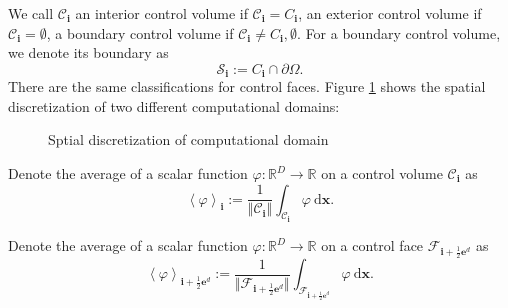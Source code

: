 We call $\mathcal{C}_{\mathbf{i}}$ an interior control volume if
$\mathcal{C}_{\mathbf{i}} = C_{\mathbf{i}}$, an exterior control volume
if $\mathcal{C}_{\mathbf{i}}=\emptyset$, a boundary control volume if
$\mathcal{C}_{\mathbf{i}}\neq C_{\mathbf{i}},\emptyset$. For a
boundary control volume, we denote its boundary as
\begin{equation}
  \label{eq:boundaryOfvolume}
  \mathcal{S}_{\mathbf{i}} := {C}_{\mathbf{i}}\cap\partial\Omega.
\end{equation}
There are the same classifications for control faces. Figure
\ref{fig:SpatialDiscretizationOfCD}  shows the spatial discretization
of two different computational domains:

\begin{figure}[htbp]
  \centering
  \hspace{2cm}
  
  \caption{Sptial discretization of computational domain}
  \label{fig:SpatialDiscretizationOfCD}
\end{figure}

\begin{defn}
  Denote the average of a scalar function
  $\varphi:\mathbb{R}^D\rightarrow\mathbb{R}$ on a control volume
  $\mathcal{C}_{\mathbf{i}}$ as
  \begin{equation}
    \left<\varphi\right>_{\mathbf{i}} := \frac{1}{\Vert
      \mathcal{C}_{\mathbf{i}}\Vert}\int_{\mathcal{C}_{\mathbf{i}}}
    \varphi\  \mathrm{d}\mathbf{x}.
  \end{equation}
\end{defn}

\begin{defn}
  Denote the average of a scalar function
  $\varphi:\mathbb{R}^D\rightarrow\mathbb{R}$ on a control face
  $\mathcal{F}_{\mathbf{i}+\frac{1}{2}\mathbf{e}^d}$ as
  \begin{equation}
    \left<\varphi\right>_{\mathbf{i}+\frac{1}{2}\mathbf{e}^d} := \frac{1}{\Vert
      \mathcal{F}_{\mathbf{i}+\frac{1}{2}\mathbf{e}^d}\Vert}\int_{\mathcal{F}_{\mathbf{i}+\frac{1}{2}\mathbf{e}^d}}\varphi\
    \mathrm{d}\mathbf{x}.  
  \end{equation}
\end{defn}

